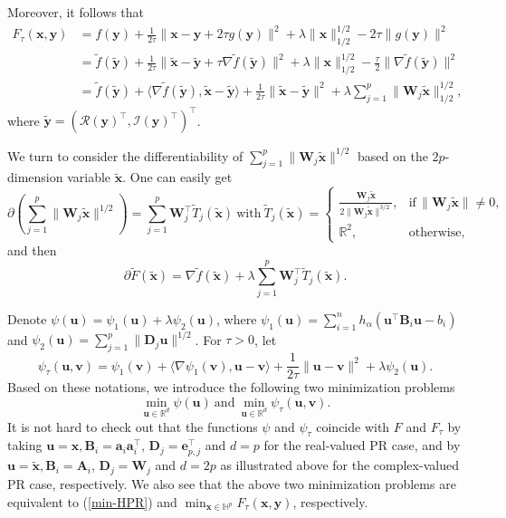 \documentclass{article}
\numberwithin{equation}{section}
\begin{document}
Moreover, it follows that
$$\begin{aligned}
F_\tau(\mathbf{x},\mathbf{y})\nonumber
&=f(\mathbf{y})+\frac{1}{2\tau}\|\mathbf{x}-\mathbf{y}+2\tau g(\mathbf{y})\|^2+\lambda\|\mathbf{x}\|_{1/2}^{1/2}-2\tau\|g(\mathbf{y})\|^2\nonumber\\
&=\tilde{f}(\tilde{\mathbf{y}})+\frac{1}{2\tau}\|\tilde{\mathbf{x}}-\tilde{\mathbf{y}}+\tau \nabla \tilde{f}(\tilde{\mathbf{y}})\|^2 +\lambda\|\mathbf{x}\|_{1/2}^{1/2}
-\frac{\tau}{2}\|\nabla\tilde{f}(\tilde{\mathbf{y}})\|^2\nonumber\\
&=\tilde{f}(\tilde{\mathbf{y}})+\langle\nabla \tilde{f}(\tilde{\mathbf{y}}),\tilde{\mathbf{x}}-\tilde{\mathbf{y}}\rangle
+\frac{1}{2\tau}\|\tilde{\mathbf{x}}-\tilde{\mathbf{y}}\|^2+\lambda\sum_{j=1}^p\|\mathbf{W}_j\tilde{\mathbf{x}}\|_{1/2}^{1/2},\nonumber
\end{aligned}
$$
where $\tilde{\mathbf{y}}=( \mathcal{R}(\mathbf{y})^\top, \mathcal{I}(\mathbf{y})^\top)^\top$.




We turn to consider the differentiability of $\sum_{j=1}^p\|\mathbf{W}_j\tilde{\mathbf{x}}\|^{1/2}$ based on the $2p$-dimension variable $\tilde{\mathbf{x}}$. One can easily get
$$\partial(\sum_{j=1}^p\|\mathbf{W}_j\tilde{\mathbf{x}}\|^{1/2})=\sum_{j=1}^p\mathbf{W}_j^\top\tilde{T}_j(\tilde{\mathbf{x}})~\mbox{with}~ \tilde{T}_j(\tilde{\mathbf{x}})=\begin{cases}
\frac{\mathbf{W}_j\tilde{\mathbf{x}}}{2\|\mathbf{W}_j\tilde{\mathbf{x}}\|^{3/2}},&{ \mbox{if}\,\|\mathbf{W}_j\tilde{\mathbf{x}}\|\neq0},\\
{\mathbb{R}^{2},}&{\mbox{otherwise}},
\end{cases}$$
and then
$$\partial\tilde{F}(\tilde{\mathbf{x}})=\nabla \tilde{f}(\tilde{\mathbf{x}})+\lambda\sum_{j=1}^p\mathbf{W}_j^\top\tilde{T}_j(\tilde{\mathbf{x}}).$$


Denote $\psi(\mathbf{u})= \psi_1(\mathbf{u})+\lambda\psi_2(\mathbf{u})$,
where $\psi_1(\mathbf{u})=\sum_{i=1}^nh_\alpha(\mathbf{u}^\top\mathbf{B}_i\mathbf{u}-b_i)$ and $\psi_2(\mathbf{u})=\sum_{j=1}^p\|\mathbf{D}_j\mathbf{u}\|^{1/2}$.
For $\tau>0$, let $$\psi_{\tau}(\mathbf{u}, \mathbf{v})=\psi_1(\mathbf{v})+\langle\nabla \psi_1(\mathbf{v}),\mathbf{u}-\mathbf{v}\rangle
+\frac{1}{2\tau}\|\mathbf{u}-\mathbf{v}\|^2+\lambda\psi_2(\mathbf{u}).$$
Based on these notations, we introduce the following two minimization problems
\begin{equation}\label{uni-frame} \nonumber
\min_{\mathbf{u}\in\mathbb{R}^d} \psi(\mathbf{u})
~\mbox{and}~\min_{\mathbf{u}\in\mathbb{R}^d} \psi_\tau(\mathbf{u}, \mathbf{v}).
\end{equation}
It is not hard to check out that the functions $\psi$ and $\psi_\tau$ coincide with $F$ and $F_\tau$
by taking $\mathbf{u}=\mathbf{x}, \mathbf{B}_i=\mathbf{a}_i\mathbf{a}_i^\top$,  $\mathbf{D}_j=\mathbf{e}_{p,j}^\top$ and $d=p$ for the real-valued PR case, and by $\mathbf{u}=\tilde{\mathbf{x}}, \mathbf{B}_i=\mathbf{A}_i$,  $\mathbf{D}_j=\mathbf{W}_j$ and $d=2p$ as illustrated above for the complex-valued PR case, respectively. We also  see that the above two minimization problems are equivalent to (\ref{min-HPR})
and $\min_{\mathbf{x}\in\mathbb{H}^p}F_\tau(\mathbf{x},\mathbf{y})$, respectively.
\end{document}
